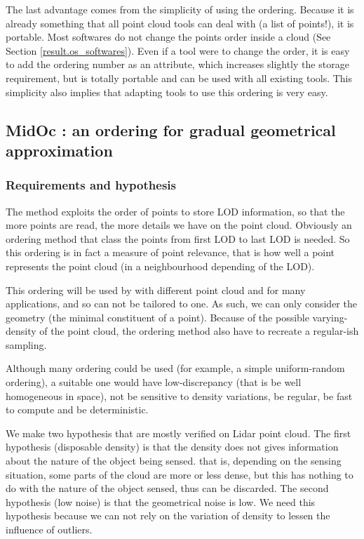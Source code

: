 				The last advantage comes from the simplicity of using the ordering. 
				Because it is already something that all point cloud tools can deal with (a list of points!), it is portable. Most softwares do not change the points order inside a cloud (See Section \ref{result.os_softwares}).
				Even if a tool were to change the order, it is easy to add the ordering number as an attribute, which increases slightly the storage requirement, but is totally portable and can be used with all existing tools.
				This simplicity also implies that adapting tools to use this ordering is very easy.
	
	
	\subsection{MidOc : an ordering for gradual geometrical approximation}
		\label{method:midoc}
		\subsubsection{Requirements and hypothesis}
		
		The method exploits the order of points to store LOD information, so that the more points are read, the more details we have on the point cloud.
		Obviously an ordering method that class the points from first LOD to last LOD is needed.
		So this ordering is in fact a measure of point relevance, that is how well a point represents the point cloud (in a neighbourhood depending of the LOD).
		
		This ordering will be used by with different point cloud and for many applications, and so can not be tailored to one.
		As such, we can only consider the geometry (the minimal constituent of a point).
		Because of the possible varying-density of the point cloud, the ordering method also have to recreate a regular-ish sampling.
		
		Although many ordering could be used (for example, a simple uniform-random ordering),
		a suitable one would have low-discrepancy (that is be well homogeneous in space), not be sensitive to density variations, be regular, be fast to compute and be deterministic.
		
		We make two hypothesis that are mostly verified on Lidar point cloud.
		The first hypothesis (disposable density) is that the density does not gives information about the nature of the object being sensed. 
		that is, depending on the sensing situation, some parts of the cloud are more or less dense, but this has nothing to do with the nature of the object sensed, thus can be discarded.
		The second hypothesis (low noise) is that the geometrical noise is low.
		We need this hypothesis because we can not rely on the variation of density to lessen the influence of outliers.
		
